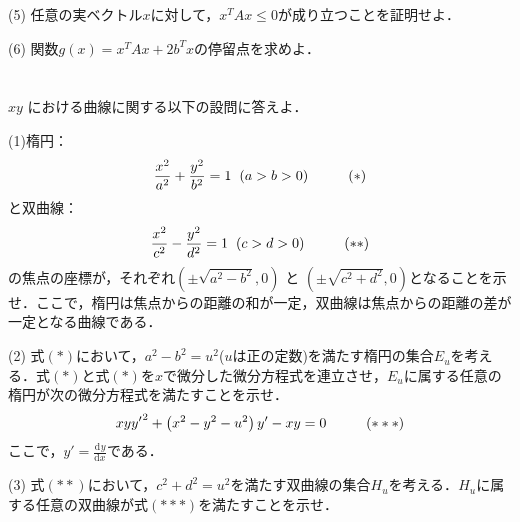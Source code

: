 \documentclass[a4j]{jarticle}
\let \ds \displaystyle
\newcommand{\diff}[3]{
  \frac{\mathrm{d}^{#1} #2}{\mathrm{d} #3^{#1}}
}
\begin{document}
\begin{screen}
 (5) 任意の実ベクトル$x$に対して，$x^TAx \leq 0$が成り立つことを証明せよ．
\end{screen}

\begin{screen}
 (6) 関数$g(x)=x^TAx + 2b^Tx$の停留点を求めよ．
\end{screen}

\section{}

\begin{screen}
 $xy$ における曲線に関する以下の設問に答えよ．
\end{screen}
\begin{screen}
 (1)楕円：
 \begin{align*}
  \frac{x^2}{a^2}+\frac{y^2}{b^2}=1 \hspace{2mm} (a>b>0) \hspace{10mm} (\ast)
 \end{align*}
 と双曲線：
 \begin{align*}
  \frac{x^2}{c^2}-\frac{y^2}{d^2}=1 \hspace{2mm} (c>d>0) \hspace{10mm} (\ast\ast)
 \end{align*}
 の焦点の座標が，それぞれ$\ds \left(\pm\sqrt{a^2-b^2},0\right)$ と $\ds\left(\pm\sqrt{c^2+d^2},0\right)$となることを示せ．ここで，楕円は焦点からの距離の和が一定，双曲線は焦点からの距離の差が一定となる曲線である．
\end{screen}


\begin{screen}
 (2) 式$(\ast)$において，$a^2-b^2=u^2$($u$は正の定数)を満たす楕円の集合$E_u$を考える．式$(\ast)$と式$(\ast)$を$x$で微分した微分方程式を連立させ，$E_u$に属する任意の楕円が次の微分方程式を満たすことを示せ．
 \begin{align*}
  xy{y'}^2 + \left(x^2-y^2-u^2\right)y' - xy = 0 \hspace{10mm} (\ast\ast\ast)
 \end{align*}
 ここで，$\ds y' = \diff{}{y}{x}$である．
\end{screen}

\begin{screen}
 (3) 式$(\ast\ast)$において，$c^2+d^2=u^2$を満たす双曲線の集合$H_u$を考える．$H_u$に属する任意の双曲線が式$(\ast\ast\ast)$を満たすことを示せ．
\end{screen}
\end{document}
